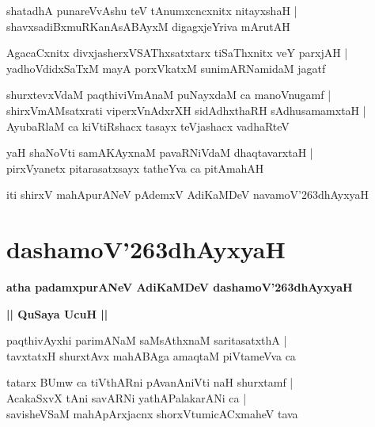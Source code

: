 \documentclass[twoside,12pt,openright]{book}
\def\S{\char'263}
\newcounter{shloka}[chapter]
\def\uvaca#1{\centerline{{\large\textbf{#1}}}}
\begin{document}
\begin{shloka}
shatadhA punareVvAshu teV tAnumxcncxnitx nitayxshaH |\\
shavxsadiBxmuRKanAsABAyxM digagxjeYriva mArutAH
\end{shloka}

\begin{shloka}
AgacaCxnitx divxjasherxVSAThxsatxtarx tiSaThxnitx veY parxjAH |\\
yadhoVdidxSaTxM mayA porxVkatxM sunimARNamidaM jagatf 
\end{shloka}

\begin{shloka}
shurxtevxVdaM paqthiviVmAnaM puNayxdaM ca manoVnugamf |\\
shirxVmAMsatxrati viperxVnAdxrXH sidAdhxthaRH sAdhusamamxtaH |\\
AyubaRlaM ca kiVtiRshacx tasayx teVjashacx vadhaRteV
\end{shloka}

\begin{shloka}
yaH shaNoVti samAKAyxnaM pavaRNiVdaM dhaqtavarxtaH |\\
pirxVyanetx pitarasatxsayx tatheYva ca pitAmahAH
\end{shloka}

\begin{center}
iti shirxV mahApurANeV pAdemxV AdiKaMDeV navamoV\S dhAyxyaH
\end{center}

\chapter{dashamoV\S dhAyxyaH}

\begin{center}
{\LARGE\bfseries atha padamxpurANeV AdiKaMDeV dashamoV\S dhAyxyaH}
\end{center}

\uvaca{|| QuSaya UcuH ||}

\begin{shloka}
paqthivAyxhi parimANaM saMsAthxnaM saritasatxthA |\\
tavxtatxH shurxtAvx mahABAga amaqtaM piVtameVva ca
\end{shloka}

\begin{shloka}
tatarx BUmw ca tiVthARni pAvanAniVti naH shurxtamf |\\
AcakaSxvX tAni savARNi yathAPalakarANi ca |\\
savisheVSaM mahApArxjacnx shorxVtumicACxmaheV tava
\end{shloka}
\end{document}
